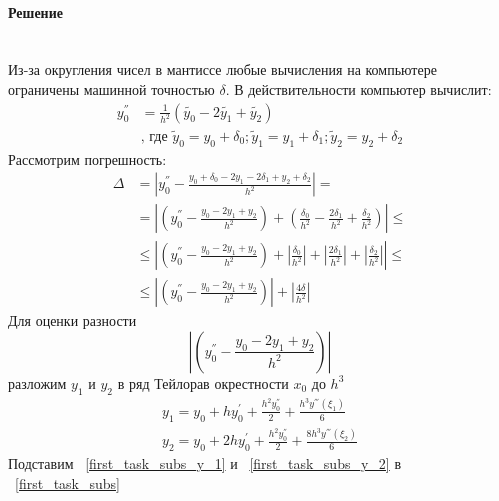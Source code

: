 \paragraph{Решение} ~\\
Из-за округления чисел в мантиссе любые вычисления на компьютере ограничены машинной точностью $\delta$.
В действительности компьютер вычислит:
\begin{align*}
  y_{0}^{''} & = \frac{1}{h^2} (\widetilde{y_{0}} - 2 \widetilde{y_{1}} + \widetilde{y_{2}})\\
  & \text{, где } \widetilde y_{0} = y_{0} + \delta_{0}; \widetilde y_{1} = y_{1} + \delta_{1}; \widetilde y_{2} = y_{2} + \delta_{2}
\end{align*}
Рассмотрим погрешность:
\begin{equation*}
  \begin{split}
    \Delta & = \left| y_{0}^{''} - \frac{y_{0} + \delta_{0} - 2 y_{1} - 2\delta_{1} + y_{2} + \delta_{2}}{h^{2}} \right| = \\[2mm]
    & = \left| \left( y_{0}^{''} - \frac{y_{0} - 2y_{1} + y_{2}}{h^{2}} \right) + \left( \frac{\delta_{0}}{h^{2}} - \frac{2\delta_{1}}{h^{2}} + \frac{\delta_{2}}{h^{2}} \right)\right| \leq \\[2mm]
    & \leq \left| \left( y_{0}^{''} - \frac{y_{0} - 2y_{1} + y_{2}}{h^{2}}  \right) + \left|\frac{\delta_{0}}{h^{2}}\right| + \left|\frac{2\delta_{1}}{h^{2}}\right| + \left|\frac{\delta_{2}}{h^{2}}\right|  \right| \leq \\[2mm]
    & \leq \left| \left( y_{0}^{''} - \frac{y_{0} - 2y_{1} + y_{2}}{h^{2}}  \right)  \right| + \left| \frac{4\delta}{h^{2}} \right|
  \end{split}
\end{equation*}
Для оценки разности
\begin{equation}
  \left| \left(y_{0}^{''} - \frac{y_{0} - 2y_{1} + y_{2}}{h^{2}} \right) \right| \label{first_task_subs}
\end{equation}
разложим $y_{1}$ и $y_{2}$ в ряд Тейлорав окрестности $x_{0}$ до $h^{3}$
\begin{gather}
  y_{1} = y_{0} + h y_{0}^{'} + \frac{h^{2}y_{0}^{''}}{2} + \frac{h^{3}y^{'''}(\xi_{1})}{6} \label{first_task_subs_y_1}\\
    y_{2} = y_{0} + 2hy_{0}^{'} + \frac{h^{2}y_{0}^{''}}{2} + \frac{8h^{3}y^{'''}(\xi_{2})}{6} \label{first_task_subs_y_2}
\end{gather}
Подставим ~\eqref{first_task_subs_y_1} и ~\eqref{first_task_subs_y_2} в ~\eqref{first_task_subs}
